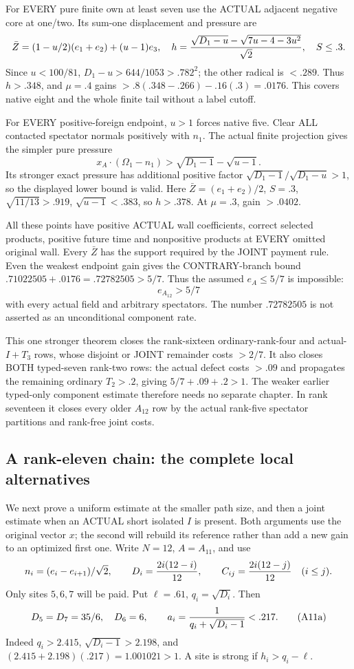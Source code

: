 \documentclass[11pt]{article}
\begin{document}
For EVERY pure finite own at least seven use
the ACTUAL adjacent negative core at one/two.
Its sum-one displacement and pressure are
\[
 \bar Z=(1-u/2)(e_1+e_2)+(u-1)e_3,\quad
 h={\sqrt{D_1-u}-\sqrt{7u-4-3u^2}\over\sqrt2},
 \quad S\le.3 .
\]
Since \(u<100/81\),
\(D_1-u>644/1053>.782^2\);
the other radical is \(<.289\).
Thus \(h>.348\), and \(\mu=.4\) gains
\(>.8(.348-.266)-.16(.3)=.0176\).
This covers native eight and the whole finite
tail without a label cutoff.

For EVERY positive-foreign endpoint, \(u>1\)
forces native five.
Clear ALL contacted spectator normals positively
with \(n_1\).
The actual finite projection gives the simpler
pure pressure
\[
 x_A\cdot(\Omega_1-n_1)>
                  \sqrt{D_1-1}-\sqrt{u-1}.
\]
Its stronger exact pressure has additional
positive factor
\(\sqrt{D_1-1}/\sqrt{D_1-u}>1\), so the
displayed lower bound is valid.
Here \(\bar Z=(e_1+e_2)/2\), \(S=.3\),
\(\sqrt{11/13}>.919\), \(\sqrt{u-1}<.383\),
so \(h>.378\).
At \(\mu=.3\), gain \(>.0402\).

All these points have positive ACTUAL wall
coefficients, correct selected products, positive
future time and nonpositive products at EVERY
omitted original wall.
Every \(\bar Z\) has the support required
by the JOINT payment rule.
Even the weakest endpoint gain gives the
CONTRARY-branch bound
\(.71022505+.0176=.72782505>5/7\).
Thus the assumed \(e_A\le5/7\) is impossible:
\[
                                  e_{A_{12}}>5/7
\tag{A12U}\label{eq:arithA12universal}
\]
with every actual field and arbitrary spectators.
The number \(.72782505\) is not asserted
as an unconditional component rate.

This one stronger theorem closes the rank-sixteen
ordinary-rank-four and actual-\(I+T_3\) rows,
whose disjoint or JOINT remainder costs \(>2/7\).
It also closes BOTH typed-seven rank-two rows:
the actual defect costs \(>.09\) and propagates
the remaining ordinary \(T_2>.2\), giving
\(5/7+.09+.2>1\).
The weaker earlier typed-only component estimate
therefore needs no separate chapter.
In rank seventeen it closes every older
\(A_{12}\) row by the actual rank-five spectator
partitions and rank-free joint costs.

\subsection{A rank-eleven chain: the complete local alternatives}
\label{app:arithA11local}

We next prove a uniform estimate at the smaller
path size, and then a joint estimate when an
ACTUAL short isolated \(I\) is present.
Both arguments use the original vector \(x\);
the second will rebuild its reference rather
than add a new gain to an optimized first one.
Write \(N=12\), \(A=A_{11}\), and use
\[
 n_i=(e_i-e_{i+1})/\sqrt2,\qquad
 D_i={2i(12-i)\over12},\qquad
 C_{ij}={2i(12-j)\over12}\quad(i\le j).
\]
Only sites \(5,6,7\) will be paid.
Put \(\ell=.61\), \(q_i=\sqrt{D_i}\).
Then
\[
 D_5=D_7=35/6,\quad D_6=6,\qquad
 a_i={1\over q_i+\sqrt{D_i-1}}<.217.
\tag{A11a}\label{eq:arithA11a}
\]
Indeed \(q_i>2.415\),
\(\sqrt{D_i-1}>2.198\), and
\((2.415+2.198)(.217)=1.001021>1\).
A site is strong if \(h_i>q_i-\ell\).
\end{document}
